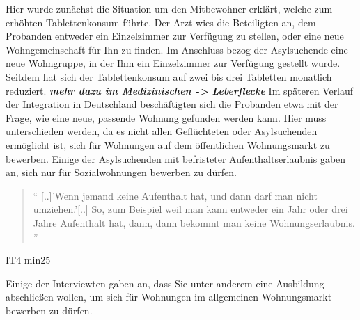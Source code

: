 Hier wurde zunächst die Situation um den Mitbewohner erklärt, welche zum erhöhten Tablettenkonsum führte. Der Arzt wies die Beteiligten an, dem Probanden entweder ein Einzelzimmer zur Verfügung zu stellen, oder eine neue Wohngemeinschaft für Ihn zu finden.\newline
Im Anschluss bezog der Asylsuchende eine neue Wohngruppe, in der Ihm ein Einzelzimmer zur Verfügung gestellt wurde. Seitdem hat sich der Tablettenkonsum auf zwei bis drei Tabletten monatlich reduziert. \textit{\textbf{mehr dazu im Medizinischen -> Leberflecke}}\newline
Im späteren Verlauf der Integration in Deutschland beschäftigten sich die Probanden etwa mit der Frage, wie eine neue, passende Wohnung gefunden werden kann. Hier muss unterschieden werden, da es nicht allen Geflüchteten oder Asylsuchenden ermöglicht ist, sich für Wohnungen auf dem öffentlichen Wohnungsmarkt zu bewerben. Einige der Asylsuchenden mit befristeter Aufenthaltserlaubnis gaben an, sich nur für Sozialwohnungen bewerben zu dürfen.
\begin{quote}
    `` [..]'Wenn jemand keine Aufenthalt hat, und dann darf man nicht umziehen.'[..] So, zum Beispiel weil man kann entweder ein Jahr oder drei Jahre Aufenthalt hat, dann, dann bekommt man keine Wohnungserlaubnis. ''
\end{quote}
\caption{IT4 min25}
Einige der Interviewten gaben an, dass Sie unter anderem eine Ausbildung abschließen wollen, um sich für Wohnungen im allgemeinen Wohnungsmarkt bewerben zu dürfen.\newline